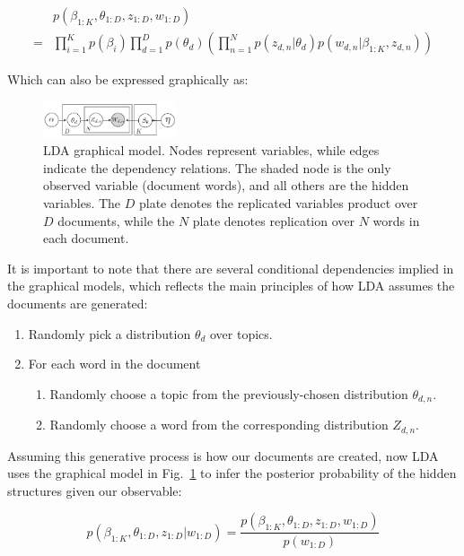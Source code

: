 \documentclass[conference]{IEEEtran}
\begin{document}
\begin{align*}
	&p(\beta_{1:K}, \theta_{1:D}, z_{1:D}, w_{1:D})\\
	=& \prod_{i=1}^K p(\beta_i)\prod_{d=1}^D p(\theta_d) \left( \prod_{n=1}^N p(z_{d,n} | \theta_d) p(w_{d,n} | \beta_{1:K}, z_{d,n})\right)
\end{align*}

Which can also be expressed graphically as:
\begin{figure}[h]
	\center
	\includegraphics[width=0.35\textwidth]{fig/gm.png}
	\caption{LDA graphical model. Nodes represent variables, while edges indicate the dependency relations. The shaded node is the only observed variable (document words), and all others are the hidden variables. The $D$ plate denotes the replicated variables product over $D$ documents, while the $N$ plate denotes replication over $N$ words in each document.}
	\label{graphical_model}
\end{figure}

It is important to note that there are several conditional dependencies implied in the graphical models, which reflects the main principles of how LDA assumes the documents are generated:

\begin{enumerate}
\item Randomly pick a distribution $\theta_d$ over topics.
\item For each word in the document
	\begin{enumerate}
	\item Randomly choose a topic from the previously-chosen distribution $\theta_{d,n}$.
	\item Randomly choose a word from the corresponding distribution $Z_{d,n}$.
	\end{enumerate}
\end{enumerate}

Assuming this generative process is how our documents are created, now LDA uses the graphical model in Fig.~\ref{graphical_model} to infer the posterior probability of the hidden structures given our observable:

\begin{equation*}
p(\beta_{1:K}, \theta_{1:D}, z_{1:D} | w_{1:D}) = \frac{p(\beta_{1:K}, \theta_{1:D}, z_{1:D}, w_{1:D})}{p(w_{1:D})}
\end{equation*}
\end{document}
